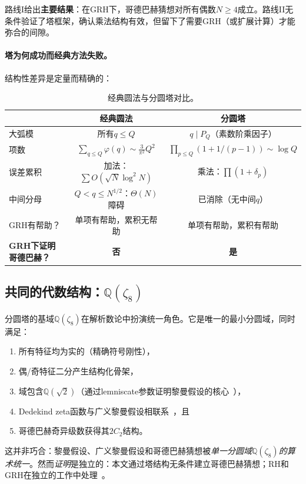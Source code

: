 \documentclass[11pt,a4paper]{article}
\theoremstyle{remark}
\newcommand{\Q}{\mathbb{Q}}
\begin{document}
路线I给出\textbf{主要结果}：在GRH下，哥德巴赫猜想对所有偶数$N \geq 4$成立。路线II无条件验证了塔框架，确认乘法结构有效，但留下了需要GRH（或扩展计算）才能弥合的间隙。

\paragraph{塔为何成功而经典方法失败。}
结构性差异是定量而精确的：

\begin{table}[ht]
\centering
\caption{经典圆法与分圆塔对比。}
\label{tab:method-comparison}
\begin{tabular}{lcc}
\toprule
 & \textbf{经典圆法} & \textbf{分圆塔} \\
\midrule
大弧模 & 所有$q \leq Q$
  & $q \mid P_Q$（素数阶乘因子） \\
项数 & $\sum_{q \leq Q}\varphi(q) \sim \frac{3}{\pi^2}Q^2$
  & $\prod_{p \leq Q}(1+1/(p-1)) \sim \log Q$ \\
误差累积 & 加法：$\sum O(\sqrt{N}\log^2 N)$
  & 乘法：$\prod(1+\delta_p)$ \\
中间分母 & $Q < q \leq N^{1/2}$：$\Theta(N)$障碍
  & 已消除（无中间$q$） \\
GRH有帮助？ & 单项有帮助，累积无帮助
  & 单项有帮助，累积有帮助 \\
\textbf{GRH下证明哥德巴赫？} & \textbf{否} & \textbf{是} \\
\bottomrule
\end{tabular}
\end{table}

\subsection{共同的代数结构：$\Q(\zeta_8)$}

分圆塔的基域$\Q(\zeta_8)$在解析数论中扮演统一角色。它是唯一的最小分圆域，同时满足：
\begin{enumerate}[nosep]
  \item 所有特征均为实的（精确符号刚性），
  \item 偶/奇特征二分产生结构化骨架，
  \item 域包含$\Q(\sqrt{2})$（通过lemniscate参数证明黎曼假设的核心~\cite{Chen2026RH}），
  \item Dedekind zeta函数与广义黎曼假设相联系~\cite{Chen2026GRH}，且
  \item 哥德巴赫奇异级数获得其$2C_2$结构。
\end{enumerate}

这并非巧合：黎曼假设、广义黎曼假设和哥德巴赫猜想被\emph{单一分圆域}$\Q(\zeta_8)$\emph{的算术统一}。然而\emph{证明}是独立的：本文通过塔结构无条件建立哥德巴赫猜想；RH和GRH在独立的工作中处理~\cite{Chen2026RH,Chen2026GRH}。
\end{document}
